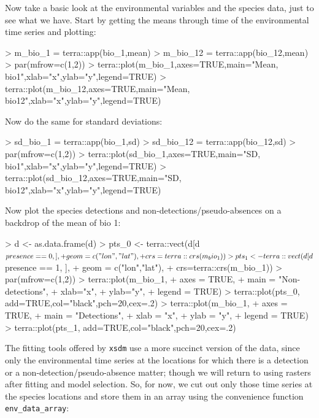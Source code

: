 \documentclass[11pt]{article}
\begin{document}
Now take a basic look at the environmental variables and the species data, just to see what we
have. Start
by getting the means through time of the environmental time series and plotting:
\begin{Schunk}
\begin{Sinput}
> m_bio_1 = terra::app(bio_1,mean)
> m_bio_12 = terra::app(bio_12,mean)
> par(mfrow=c(1,2))
> terra::plot(m_bio_1,axes=TRUE,main="Mean, bio1",xlab="x",ylab="y",legend=TRUE)
> terra::plot(m_bio_12,axes=TRUE,main="Mean, bio12",xlab="x",ylab="y",legend=TRUE)
\end{Sinput}
\end{Schunk}

\noindent Now do the same for standard deviations:
\begin{Schunk}
\begin{Sinput}
> sd_bio_1 = terra::app(bio_1,sd)
> sd_bio_12 = terra::app(bio_12,sd)
> par(mfrow=c(1,2))
> terra::plot(sd_bio_1,axes=TRUE,main="SD, bio1",xlab="x",ylab="y",legend=TRUE)
> terra::plot(sd_bio_12,axes=TRUE,main="SD, bio12",xlab="x",ylab="y",legend=TRUE)
\end{Sinput}
\end{Schunk}

\noindent Now plot the species detections and non-detections/pseudo-absences on a backdrop of the mean of bio 1:
\begin{Schunk}
\begin{Sinput}
> d <- as.data.frame(d)
> pts_0 <- terra::vect(d[d$presence == 0, ],
+                      geom=c("lon","lat"),
+                      crs=terra::crs(m_bio_1))
> pts_1 <- terra::vect(d[d$presence == 1, ],
+                      geom = c("lon","lat"),
+                      crs=terra::crs(m_bio_1))
> par(mfrow=c(1,2))
> terra::plot(m_bio_1,
+             axes = TRUE,
+             main = "Non-detections",
+             xlab="x",
+             ylab="y",
+             legend = TRUE)
> terra::plot(pts_0, add=TRUE,col="black",pch=20,cex=.2)
> terra::plot(m_bio_1,
+             axes = TRUE,
+             main = "Detections",
+             xlab = "x",
+             ylab = "y",
+             legend = TRUE)
> terra::plot(pts_1, add=TRUE,col="black",pch=20,cex=.2)
\end{Sinput}
\end{Schunk}

The fitting tools offered by \texttt{xsdm} use a more succinct version of the data,
since only the environmental time series at the locations for which there is a 
detection or a non-detection/pseudo-absence matter; though we will return to using 
rasters after fitting and model selection. So, for now, we cut out only those
time series at the species locations and store them in an array using the convenience 
function \texttt{env\_data\_array}:
\end{document}
